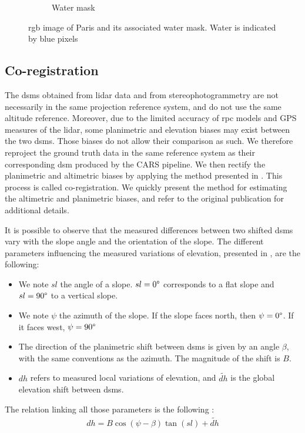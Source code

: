 \begin{figure}
\begin{subfigure}[t]{0.48\linewidth}
        \caption{Water mask}
        \label{fig:paris_watermask_2}
    \end{subfigure}
    \caption{\acrshort{rgb} image of Paris and its associated water mask. Water is indicated by blue pixels}
    \label{fig:paris_watermask}
\end{figure}

\subsection{Co-registration}
The \acrshort{dsm}s obtained from \acrshort{lidar} data and from stereophotogrammetry are not necessarily in the same projection reference system, and do not use the same altitude reference. Moreover, due to the limited accuracy of \acrshort{rpc} models and GPS measures of the \acrshort{lidar}, some planimetric and elevation biases may exist between the two \acrshort{dsm}s. Those biases do not allow their comparison as such. We therefore reproject the ground truth data in the same reference system as their corresponding \acrshort{dsm} produced by the CARS pipeline. We then rectify the planimetric and altimetric biases by applying the method presented in \cite{nuth_co-registration_2011}. This process is called co-registration. We quickly present the method for estimating the altimetric and planimetric biases, and refer to the original publication for additional details.

It is possible to observe that the measured differences between two shifted \acrshort{dsm}s vary with the slope angle and the orientation of the slope. The different parameters influencing the measured variations of elevation, presented in , are the following:
\begin{itemize}
    \item We note $sl$ the angle of a slope. $sl=0\degree$ corresponds to a flat slope and $sl=90\degree$ to a vertical slope.
    \item We note $\psi$ the azimuth of the slope. If the slope faces north, then $\psi=0\degree$. If it faces west, $\psi=90\degree$ \etc
    \item The direction of the planimetric shift between \acrshort{dsm}s is given by an angle $\beta$, with the same conventions as the azimuth. The magnitude of the shift is $B$.
    \item $dh$ refers to measured local variations of elevation, and $\tilde{dh}$ is the global elevation shift between \acrshort{dsm}s.
\end{itemize}
The relation linking all those parameters is the following \cite{nuth_co-registration_2011}:
\begin{align}
    dh = B\cos(\psi-\beta)\tan(sl)+\tilde{dh}
\end{align}

